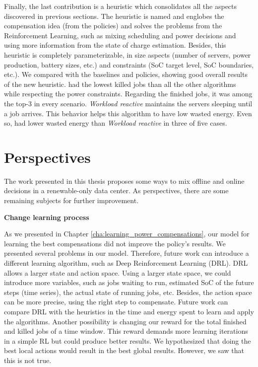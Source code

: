 Finally, the last contribution is a heuristic which consolidates all the aspects discovered in previous sections. The heuristic is named \emph{\systemName} and englobes the compensation idea (from the policies) and solves the problems from the Reinforcement Learning, such as mixing scheduling and power decisions and using more information from the state of charge estimation. Besides, this heuristic is completely parameterizable, in size aspects (number of servers, power production, battery sizes, etc.) and constraints (SoC target level, SoC boundaries, etc.). We compared \emph{\systemName} with the baselines and policies, showing good overall results of the new heuristic. \emph{\systemName} had the lowest killed jobs than all the other algorithms while respecting the power constraints. Regarding the finished jobs, it was among the top-3 in every scenario. \emph{Workload reactive} maintains the servers sleeping until a job arrives. This behavior helps this algorithm to have low wasted energy. Even so, \emph{\systemName} had lower wasted energy than \emph{Workload reactive} in three of five cases. 

\section{Perspectives}

The work presented in this thesis proposes some ways to mix offline and online decisions in a renewable-only data center. As perspectives, there are some remaining subjects for further improvement.

\textbf{Change learning process}

As we presented in Chapter \ref{cha:learning_power_compensations}, our model for learning the best compensations did not improve the policy's results. We presented several problems in our model. Therefore, future work can introduce a different learning algorithm, such as Deep Reinforcement Learning (DRL). DRL allows a larger state and action space. Using a larger state space, we could introduce more variables, such as jobs waiting to run, estimated SoC of the future steps (time series), the actual state of running jobs, etc. Besides, the action space can be more precise, using the right step to compensate. Future work can compare DRL with the heuristics in the time and energy spent to learn and apply the algorithms. Another possibility is changing our reward for the total finished and killed jobs of a time window. This reward demands more learning iterations in a simple RL but could produce better results. We hypothesized that doing the best local actions would result in the best global results. However, we saw that this is not true. 

